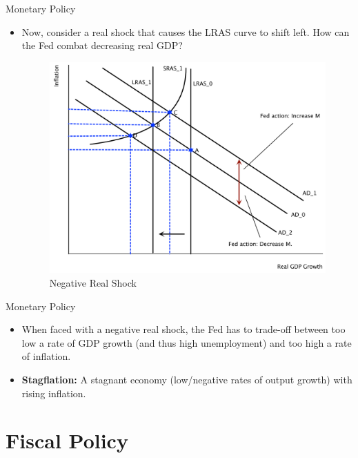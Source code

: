 \documentclass[xcolor={dvipsnames},pdf, hyperref={colorlinks=true, citecolor=ForestGreen, linkcolor=BlueViolet, urlcolor=Magenta}]{beamer}
\theoremstyle{definition}
\newcommand{\defn}[1]{\textbf{#1}}
\begin{document}
\begin{frame}{Monetary Policy}

\begin{itemize}
\item	Now, consider a real shock that causes the LRAS curve to shift left. How can the Fed combat decreasing real GDP?


\begin{figure}[H]
	\centering
	\includegraphics[scale=.35]{plot103.pdf}
	\caption{Negative Real Shock}
\end{figure}
\end{itemize}



\end{frame}

\begin{frame}{Monetary Policy}




\begin{itemize}
	\item When faced with a negative real shock, the Fed has to trade-off between too low a rate of GDP growth (and thus high unemployment) and too high a rate of inflation.
	\item \defn{Stagflation:} A stagnant economy (low/negative rates of output growth) with rising inflation.
\end{itemize}

\end{frame}

\section{Fiscal Policy}
\end{document}

